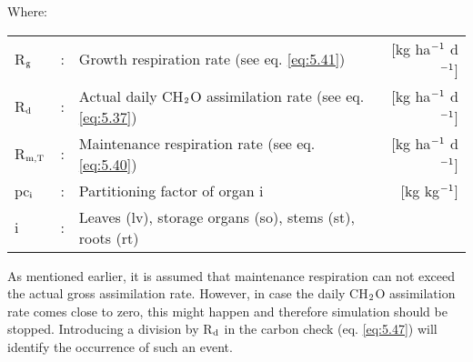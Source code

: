Where:\\[5pt]
\begin{tabularx}{\textwidth}{llXr}
	R$_{{\rm g}}$ &:& Growth respiration rate (see eq. \ref{eq:5.41})   &
	[kg ha$^{{\rm -1}}$ d$^{{\rm -1}}$]\\
	R$_{{\rm d}}$ &:& Actual daily CH$_{{\rm 2}}$O assimilation rate (see eq. \ref{eq:5.37})   &
	[kg ha$^{{\rm -1}}$ d$^{{\rm -1}}$]\\
	R$_{{\rm m,T}}$ &:& Maintenance respiration rate (see eq. \ref{eq:5.40})   &
	[kg ha$^{{\rm -1}}$ d$^{{\rm -1}}$]\\
	pc$_{{\rm i}}$ &:& Partitioning factor of organ i    &
	[kg kg$^{{\rm -1}}$]\\
	i &:& Leaves (lv), storage organs (so), stems (st), roots (rt)\\
\end{tabularx}

As mentioned earlier, it is assumed that maintenance respiration can not exceed the actual
gross assimilation rate. However, in case the daily CH$_{{\rm 2}}$O assimilation rate comes close to
zero, this might happen and therefore simulation should be stopped. Introducing a
division by R$_{{\rm d}}$ in the carbon check (eq. \ref{eq:5.47}) will identify the occurrence of such an
event.

%
%

